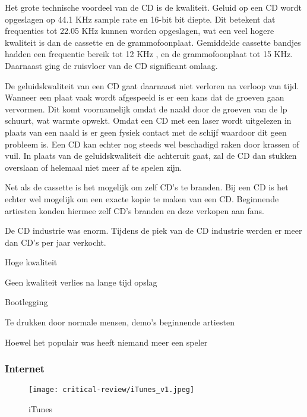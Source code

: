 Het grote technische voordeel van de CD is de kwaliteit. Geluid op een CD wordt opgeslagen op 44.1 KHz sample rate en 16-bit bit diepte. Dit betekent dat frequenties tot 22.05 KHz kunnen worden opgeslagen, wat een veel hogere kwaliteit is dan de cassette en de grammofoonplaat. Gemiddelde cassette bandjes hadden een frequentie bereik tot 12 KHz \cite{van1970audio}, en de grammofoonplaat tot 15 KHz. Daarnaast ging de ruisvloer van de CD significant omlaag.

De geluidskwaliteit van een CD gaat daarnaast niet verloren na verloop van tijd. Wanneer een plaat vaak wordt afgespeeld is er een kans dat de groeven gaan vervormen. Dit komt voornamelijk omdat de naald door de groeven van de lp schuurt, wat warmte opwekt. Omdat een CD met een laser wordt uitgelezen in plaats van een naald is er geen fysiek contact met de schijf waardoor dit geen probleem is. Een CD kan echter nog steeds wel beschadigd raken door krassen of vuil. In plaats van de geluidskwaliteit die achteruit gaat, zal de CD dan stukken overslaan of helemaal niet meer af te spelen zijn.

Net als de cassette is het mogelijk om zelf CD's te branden. Bij een CD is het echter wel mogelijk om een exacte kopie te maken van een CD. Beginnende artiesten konden hiermee zelf CD's branden en deze verkopen aan fans.

De CD industrie was enorm. Tijdens de piek van de CD industrie werden er meer dan  CD's per jaar verkocht.


\begin{todolist}
    \item[\done] Hoge kwaliteit
    \item[\done] Geen kwaliteit verlies na lange tijd opslag
    \item Bootlegging
    \item[\done] Te drukken door normale mensen, demo's beginnende artiesten
    \item Hoewel het populair was heeft niemand meer een speler
\end{todolist}

\subsubsection*{Internet}
\begin{wrapfigure}{r}{0.25\textwidth}
    \centering
    \texttt{[image: critical-review/iTunes\_v1.jpeg]}
    \caption{iTunes}
    \label{fig:critical-review:iTunes}
\end{wrapfigure}

